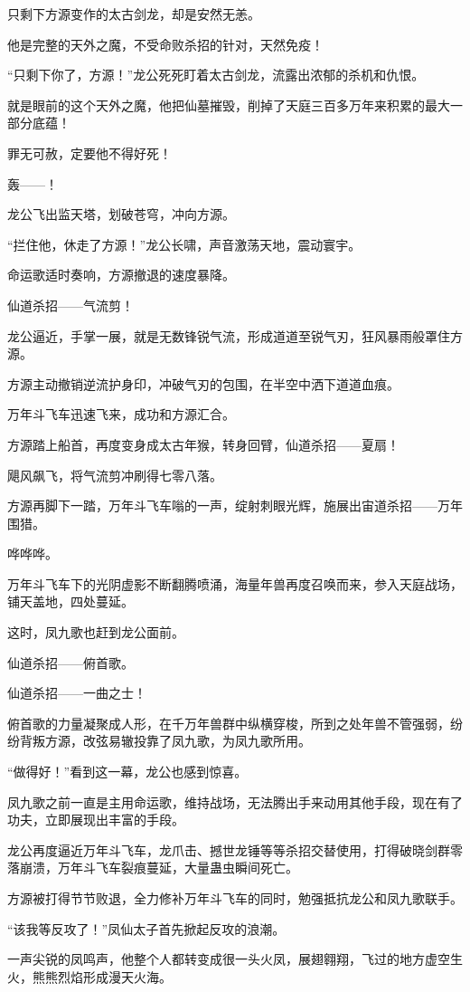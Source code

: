 \begin{this_body}
只剩下方源变作的太古剑龙，却是安然无恙。

他是完整的天外之魔，不受命败杀招的针对，天然免疫！

“只剩下你了，方源！”龙公死死盯着太古剑龙，流露出浓郁的杀机和仇恨。

就是眼前的这个天外之魔，他把仙墓摧毁，削掉了天庭三百多万年来积累的最大一部分底蕴！

罪无可赦，定要他不得好死！

轰——！

龙公飞出监天塔，划破苍穹，冲向方源。

“拦住他，休走了方源！”龙公长啸，声音激荡天地，震动寰宇。

命运歌适时奏响，方源撤退的速度暴降。

仙道杀招——气流剪！

龙公逼近，手掌一展，就是无数锋锐气流，形成道道至锐气刃，狂风暴雨般罩住方源。

方源主动撤销逆流护身印，冲破气刃的包围，在半空中洒下道道血痕。

万年斗飞车迅速飞来，成功和方源汇合。

方源踏上船首，再度变身成太古年猴，转身回臂，仙道杀招——夏扇！

飓风飙飞，将气流剪冲刷得七零八落。

方源再脚下一踏，万年斗飞车嗡的一声，绽射刺眼光辉，施展出宙道杀招——万年围猎。

哗哗哗。

万年斗飞车下的光阴虚影不断翻腾喷涌，海量年兽再度召唤而来，参入天庭战场，铺天盖地，四处蔓延。

这时，凤九歌也赶到龙公面前。

仙道杀招——俯首歌。

仙道杀招——一曲之士！

俯首歌的力量凝聚成人形，在千万年兽群中纵横穿梭，所到之处年兽不管强弱，纷纷背叛方源，改弦易辙投靠了凤九歌，为凤九歌所用。

“做得好！”看到这一幕，龙公也感到惊喜。

凤九歌之前一直是主用命运歌，维持战场，无法腾出手来动用其他手段，现在有了功夫，立即展现出丰富的手段。

龙公再度逼近万年斗飞车，龙爪击、撼世龙锤等等杀招交替使用，打得破晓剑群零落崩溃，万年斗飞车裂痕蔓延，大量蛊虫瞬间死亡。

方源被打得节节败退，全力修补万年斗飞车的同时，勉强抵抗龙公和凤九歌联手。

“该我等反攻了！”凤仙太子首先掀起反攻的浪潮。

一声尖锐的凤鸣声，他整个人都转变成很一头火凤，展翅翱翔，飞过的地方虚空生火，熊熊烈焰形成漫天火海。


\end{this_body}
